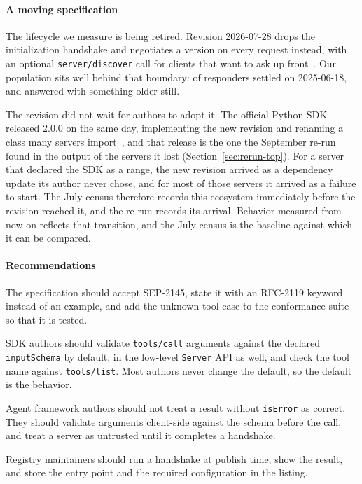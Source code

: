 \paragraph{A moving specification}
The lifecycle we measure is being retired. Revision 2026-07-28 drops the
initialization handshake and negotiates a version on every request instead, with an
optional \texttt{server/discover} call for clients that want to ask up
front~\cite{mcpversioning}. Our population sits well behind that boundary:
\PctVerOffered{} of responders settled on 2025-06-18, and \NVerDowngraded{} answered
with something older still.

The revision did not wait for authors to adopt it. The official Python SDK released
2.0.0 on the same day, implementing the new revision and renaming a class many servers
import~\cite{pysdk200}, and that release is the one the September re-run found in the
output of the servers it lost (Section~\ref{sec:rerun-top}). For a server that
declared the SDK as a range, the new revision arrived as a dependency update its
author never chose, and for most of those servers it arrived as a failure to start.
The July census therefore records this ecosystem immediately before the revision
reached it, and the re-run records its arrival. Behavior measured from now on reflects
that transition, and the July census is the baseline against which it can be
compared.

\paragraph{Recommendations}
The specification should accept SEP-2145, state it with an RFC-2119 keyword instead
of an example, and add the unknown-tool case to the conformance suite so that it is
tested.

SDK authors should validate \texttt{tools/call} arguments against the declared
\texttt{inputSchema} by default, in the low-level \texttt{Server} API as well, and
check the tool name against \texttt{tools/list}. Most authors never change the
default, so the default is the behavior.

Agent framework authors should not treat a result without \texttt{isError} as
correct. They should validate arguments client-side against the schema before the
call, and treat a server as untrusted until it completes a handshake.

Registry maintainers should run a handshake at publish time, show the result, and
store the entry point and the required configuration in the listing.
